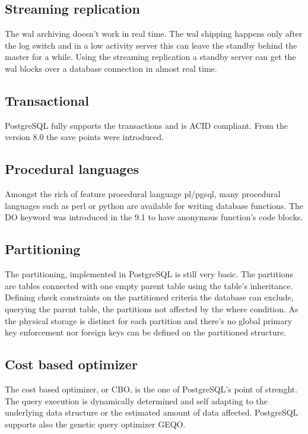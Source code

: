 \subsection{Streaming replication}
The wal archiving doesn't work in real time. The wal shipping happens only
after the log switch and in a low activity server this can leave the standby
behind the master for a while. Using the streaming replication a standby server can get the wal blocks over a database connection
in almost real time.


\subsection{Transactional}
PostgreSQL fully supports the transactions and is ACID compliant.
From the version 8.0 the save points were introduced.

\subsection{Procedural languages}
Amongst the rich of feature procedural language pl/pgsql, many procedural
languages such as perl or python are available for writing database functions.
The DO keyword was introduced in the 9.1 to have anonymous function's code
blocks.

\subsection{Partitioning}
The partitioning, implemented in
PostgreSQL is still very basic. The partitions are tables connected
with one empty parent table using the table's inheritance. 
Defining check constraints on the partitioned criteria the database can
exclude, querying the parent table, the partitions not affected by the where
condition.
As the physical storage is distinct for each partition and there's no global
primary key enforcement nor foreign keys can be defined on the partitioned
structure.

\subsection{Cost based optimizer}
The cost based optimizer, or CBO, is the
one of PostgreSQL's point of strenght.
The query execution is dynamically determined and self adapting to the
underlying data structure or the estimated amount of data affected. 
PostgreSQL supports also the genetic query optimizer GEQO.

